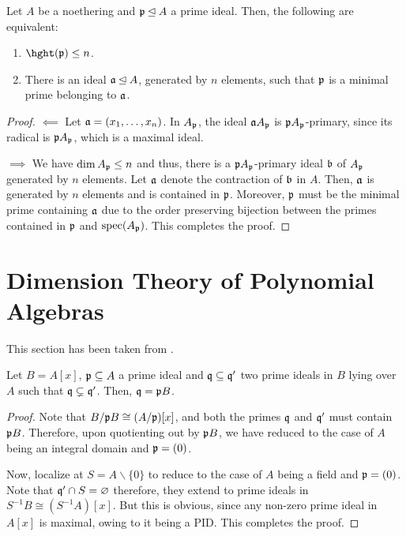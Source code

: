 \begin{corollary}
    Let $A$ be a noethering and $\mathfrak p\unlhd A$ a prime ideal. Then, the following are equivalent: 
    \begin{enumerate}[label=(\alph*)]
        \item $\hght(\frakp)\le n$. 
        \item There is an ideal $\mathfrak a\unlhd A$, generated by $n$ elements, such that $\mathfrak p$ is a minimal prime belonging to $\mathfrak a$.
    \end{enumerate}
\end{corollary}
\begin{proof}
    $\impliedby$ Let $\mathfrak a = (x_1,\dots,x_n)$. In $A_\mathfrak p$, the ideal $\mathfrak a A_\mathfrak p$ is $\mathfrak p A_\mathfrak p$-primary, since its radical is $\mathfrak p A_\mathfrak p$, which is a maximal ideal. 

    $\implies$ We have $\dim A_\mathfrak p\le n$ and thus, there is a $\mathfrak p A_\mathfrak p$-primary ideal $\mathfrak b$ of $A_\mathfrak p$ generated by $n$ elements. Let $\mathfrak a$ denote the contraction of $\mathfrak b$ in $A$. Then, $\mathfrak a$ is generated by $n$ elements and is contained in $\mathfrak p$. Moreover, $\mathfrak p$ must be the minimal prime containing $\mathfrak a$ due to the order preserving bijection between the primes contained in $\mathfrak p$ and $\operatorname{spec}(A_\mathfrak p)$. This completes the proof.\qedhere
\end{proof}

\section{Dimension Theory of Polynomial Algebras}

This section has been taken from \cite{serre-local-algebra}.

\begin{lemma}
    Let $B = A[x]$, $\mathfrak p\subseteq A$ a prime ideal and $\mathfrak q\subseteq\mathfrak q'$ two prime ideals in $B$ lying over $A$ such that $\mathfrak q\subsetneq\mathfrak q'$. Then, $\mathfrak q = \mathfrak p B$.
\end{lemma}
\begin{proof}
    Note that $B/\mathfrak p B\cong (A/\mathfrak p)[x]$, and both the primes $\mathfrak q$ and $\mathfrak q'$ must contain $\mathfrak p B$. Therefore, upon quotienting out by $\mathfrak p B$, we have reduced to the case of $A$ being an integral domain and $\mathfrak p = (0)$.

    Now, localize at $S = A\backslash\{0\}$ to reduce to the case of $A$ being a field and $\mathfrak p = (0)$. Note that $\mathfrak q'\cap S = \varnothing$ therefore, they extend to prime ideals in $S^{-1}B\cong (S^{-1}A)[x]$. But this is obvious, since any non-zero prime ideal in $A[x]$ is maximal, owing to it being a PID. This completes the proof.
\end{proof}

